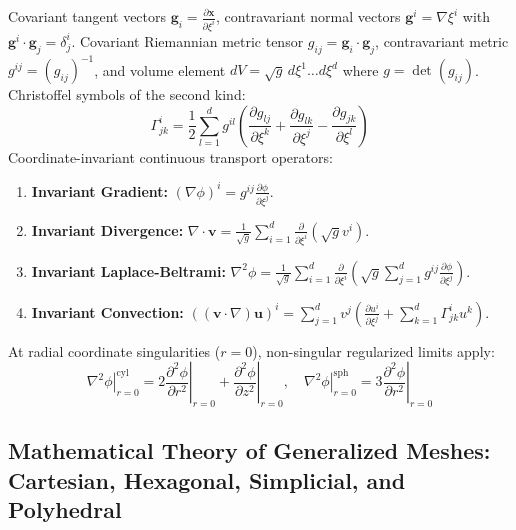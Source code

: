 \documentclass[11pt,a4paper]{article}
\begin{document}
Covariant tangent vectors $\mathbf{g}_i = \frac{\partial \mathbf{x}}{\partial \xi^i}$, contravariant normal vectors $\mathbf{g}^i = \nabla \xi^i$ with $\mathbf{g}^i \cdot \mathbf{g}_j = \delta^i_j$.
Covariant Riemannian metric tensor $g_{ij} = \mathbf{g}_i \cdot \mathbf{g}_j$, contravariant metric $g^{ij} = (g_{ij})^{-1}$, and volume element $dV = \sqrt{g} \, d\xi^1 \dots d\xi^d$ where $g = \det(g_{ij})$.
Christoffel symbols of the second kind:
\begin{equation}
\Gamma_{jk}^i = \frac{1}{2} \sum_{l=1}^d g^{il} \left( \frac{\partial g_{lj}}{\partial \xi^k} + \frac{\partial g_{lk}}{\partial \xi^j} - \frac{\partial g_{jk}}{\partial \xi^l} \right)
\end{equation}
Coordinate-invariant continuous transport operators:
\begin{enumerate}[leftmargin=*]
    \item \textbf{Invariant Gradient:} $(\nabla \phi)^i = g^{ij} \frac{\partial \phi}{\partial \xi^j}$.
    \item \textbf{Invariant Divergence:} $\nabla \cdot \mathbf{v} = \frac{1}{\sqrt{g}} \sum_{i=1}^d \frac{\partial}{\partial \xi^i} \left( \sqrt{g} v^i \right)$.
    \item \textbf{Invariant Laplace-Beltrami:} $\nabla^2 \phi = \frac{1}{\sqrt{g}} \sum_{i=1}^d \frac{\partial}{\partial \xi^i} \left( \sqrt{g} \sum_{j=1}^d g^{ij} \frac{\partial \phi}{\partial \xi^j} \right)$.
    \item \textbf{Invariant Convection:} $\left( (\mathbf{v} \cdot \nabla) \mathbf{u} \right)^i = \sum_{j=1}^d v^j \left( \frac{\partial u^i}{\partial \xi^j} + \sum_{k=1}^d \Gamma_{jk}^i u^k \right)$.
\end{enumerate}

At radial coordinate singularities ($r = 0$), non-singular regularized limits apply:
\begin{equation}
\left. \nabla^2 \phi \right|_{r=0}^{\text{cyl}} = 2 \left. \frac{\partial^2 \phi}{\partial r^2} \right|_{r=0} + \left. \frac{\partial^2 \phi}{\partial z^2} \right|_{r=0}, \quad \left. \nabla^2 \phi \right|_{r=0}^{\text{sph}} = 3 \left. \frac{\partial^2 \phi}{\partial r^2} \right|_{r=0}
\end{equation}

\subsection{Mathematical Theory of Generalized Meshes: Cartesian, Hexagonal, Simplicial, and Polyhedral}
\end{document}
